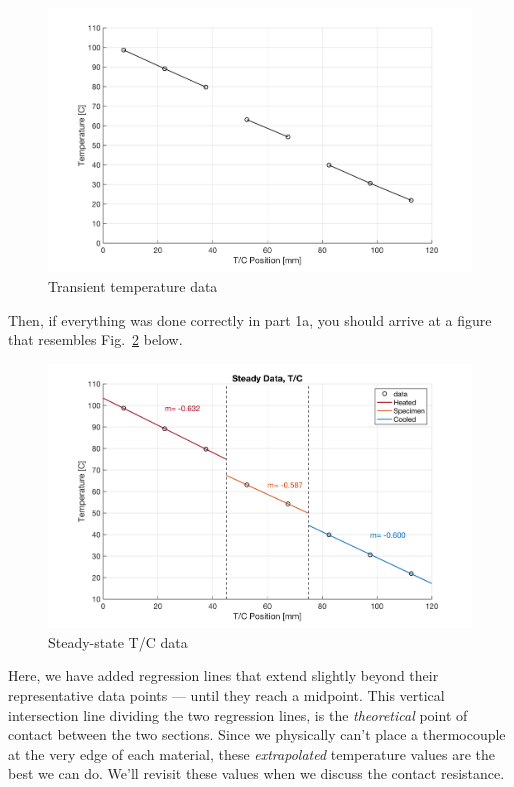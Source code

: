 \documentclass[11pt, letterpaper]{article}
\begin{document}
\begin{figure}[H]
    \begin{center}
        \includegraphics[width=125mm]{gfx/fig2.png}
    \caption{Transient temperature data}\label{fig2}
    \end{center}
\end{figure}

Then, if everything was done correctly in part 1a, you should arrive at a figure that resembles Fig.~\ref{fig3} below.

\begin{figure}[H]
    \begin{center}
        \includegraphics[width=125mm]{gfx/fig3.png}
    \caption{Steady-state T/C data}\label{fig3}
    \end{center}
\end{figure}

Here, we have added regression lines that extend slightly beyond their representative data points --- until they reach a midpoint.  This vertical intersection line dividing the two regression lines, is the \textit{theoretical} point of contact between the two sections. Since we physically can't place a thermocouple at the very edge of each material, these \textit{extrapolated} temperature values are the best we can do. We'll revisit these values when we discuss the contact resistance.
\end{document}
